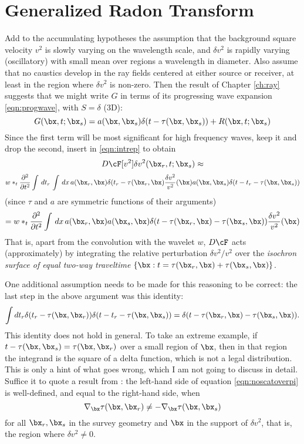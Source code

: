 \section{Generalized Radon Transform}
Add to the accumulating hypotheses the assumption that the background square velocity $v^2$ is slowly varying on the wavelength scale, and $\delta v^2$ is rapidly varying (oscillatory) with small mean over regions a wavelength in diameter. Also assume that no caustics develop in the ray fields centered at either source or receiver, at least in the region where $\delta v^2$ is non-zero. Then the result of Chapter \ref{ch:ray} suggests that we might write $G$ in terms of its progressing wave expansion \ref{eqn:progwave}, with $S = \delta$ (3D):
\begin{equation}
\label{eqn:greenprog}
G(\bx,t;\bx_s) = a(\bx,\bx_s)\delta(t-\tau(\bx,\bx_s)) + R(\bx,t;\bx_s)
\end{equation}
Since the first term will be most significant for high frequency waves, keep it and drop the second, insert in \ref{eqn:intrep} to obtain
\[
D\cF[v^2]\delta v^2(\bx_r,t;\bx_s) \approx 
\]
\[
w*_t \frac{\partial^2}{\partial t^2}\int \,dt_r\, \int \, dx \, a(\bx_r,\bx) \delta(t_r-\tau(\bx_r,\bx) \frac{\delta v^2}{v^2}(\bx) a(\bx,\bx_s)\delta(t-t_r-\tau(\bx,\bx_s))
\]
(since $\tau$ and $a$ are symmetric functions of their arguments)
\begin{equation}
\label{eqn:grt1}
= w*_t \frac{\partial^2}{\partial t^2}\int \, dx \, a(\bx_r,\bx)a(\bx_s,\bx)\delta(t-\tau(\bx_r,\bx)-\tau(\bx_s,\bx)) \frac{\delta v^2}{v^2}(\bx)
\end{equation}
That is, apart from the convolution with the wavelet $w$, $D\cF$ acts (approximately) by integrating the relative  perturbation $\delta v^2/v^2$ over the {\em isochron surface of equal two-way traveltime} $\{\bx: t=\tau(\bx_r,\bx)+\tau(\bx_s,\bx)\}$.

One additional assumption needs to be made for this reasoning to be correct: the last step in the above argument was this identity:
\begin{equation}
\label{eqn:noscatoverpi}
\int dt_r \delta(t_r-\tau(\bx,\bx_r))\delta(t-t_r-\tau(\bx,\bx_s)) = \delta(t - \tau(\bx_r,\bx)-\tau(\bx_s,\bx)).
\end{equation}
This identity does not hold in general. To take an extreme example, if $t-\tau(\bx,\bx_s) = \tau(\bx,\bx_r)$ over a small region of $\bx$, then in that region the integrand is the square of a delta function, which is not a legal distribution. This is only a hint of what goes wrong, which I am not going to discuss in detail. Suffice it to quote a result from \cite[]{GelShil:58}: the left-hand side of equation \ref{eqn:noscatoverpi} is well-defined, and equal to the right-hand side, when 
\begin{equation}
\label{eqn:noraymeet}
\nabla_{\bx}\tau(\bx,\bx_r) \ne - \nabla_{\bx}\tau(\bx,\bx_s)
\end{equation}
for all $\bx_r,\bx_s$ in the survey geometry and $\bx$ in the support of $\delta v^2$, that is, the region where $\delta v^2 \ne 0$. 

